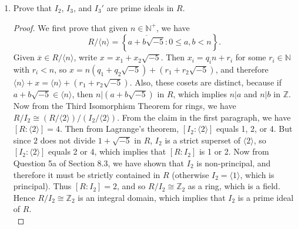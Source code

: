 \documentclass{article}
\begin{document}
\begin{enumerate}[label={\bf(\alph*)}]
\begin{proof}
        Let $1+\sqrt{-5}=xy$ in $R$. Then $N(x)$ and $N(y)$ divides
        $N(1+\sqrt{-5})=6$, and so $N(x)$ must be 1, 2, 3, or 6. We need to
        show that either $x$ or $y$ is a unit in $R$. If $N(x)=1$, 2, or 3,
        then $x=\pm1$, which is a unit. On the other hand, if $N(x)=6$,
        then $x=\pm(1\pm\sqrt{-5})$. $x=\pm(1+\sqrt{-5})$ would give
        $y=\mp1$, which is a unit. So assume $x=\pm(1-\sqrt{-5})$. But such
        $x$ will not divide $1+\sqrt{-5}$ in $R$. Thus $1+\sqrt{-5}$ is
        irreducible in $R$. \\

        The argument for testing that $1-\sqrt{-5}$ is irreducible in $R$
        is analogous with the argument for $1+\sqrt{-5}$. \\

        Since the four given elements are irreducible in $R$ and
        $6=2\cdot3=(1+\sqrt{-5})(1-\sqrt{-5})$, the given factorizations
        are distinct factorizations of 6 into irreducbles in $R$.
      \end{proof}

    \item Prove that $I_2$, $I_3$, and $I_3'$ are prime ideals in $R$.
      \begin{proof}
        We first prove that given $n\in\mathbb{N}^+$, we have
        \[R/\langle n\rangle =\left\{\overline{a+b\sqrt{-5}}:0\leq
          a,b<n\right\}.\]
        Given $\overline{x}\in R/\langle n\rangle$,
        write $x=x_1+x_2\sqrt{-5}$. Then $x_i=q_in+r_i$ for some
        $r_i\in\mathbb{N}$ with $r_i<n$, so
        $x=n(q_1+q_2\sqrt{-5})+(r_1+r_2\sqrt{-5})$, and therefore $\langle
        n\rangle+x=\langle n\rangle+(r_1+r_2\sqrt{-5})$. Also, these cosets
        are distinct, because if $a+b\sqrt{-5}\in\langle n\rangle$, then
        $n|(a+b\sqrt{-5})$ in $R$, which implies $n|a$ and $n|b$ in
        $\mathbb{Z}$. \\

        Now from the Third Isomorphism Theorem for rings, we have
        $R/I_2\cong (R/\langle2\rangle)/(I_2/\langle2\rangle)$. From the
        claim in the first paragraph, we have $[R:\langle2\rangle]=4$.
        Then from Lagrange's theorem, $[I_2:\langle2\rangle]$ equals 1, 2,
        or 4. But since $2$ does not divide $1+\sqrt{-5}$ in $R$, $I_2$ is a
        strict superset of $\langle2\rangle$, so $[I_2:\langle2\rangle]$
        equals 2 or 4, which implies that $[R:I_2]$ is 1 or 2. Now from
        Question 5a of Section 8.3, we have shown that $I_2$ is
        non-principal, and therefore it must be strictly contained in $R$
        (otherwise $I_2=\langle1\rangle$, which is principal). Thus
        $[R:I_2]=2$, and so $R/I_2\cong\mathbb{Z}_2$ as a ring, which is
        a field. Hence $R/I_2\cong\mathbb{Z}_2$ is an integral domain,
        which implies that $I_2$ is a prime ideal of $R$. \\


\end{proof}
\end{enumerate}
\end{document}
